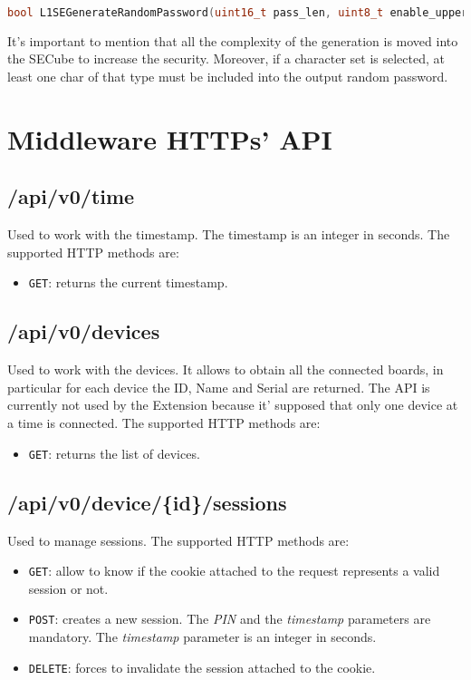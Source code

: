 \begin{lstlisting}[language=C++,breaklines=true]
	bool L1SEGenerateRandomPassword(uint16_t pass_len, uint8_t enable_upper_case, uint8_t enable_special_chars, uint8_t enable_numbers_chars, std::shared_ptr<uint8_t[]> generated_pass);
\end{lstlisting}

It's important to mention that all the complexity of the generation is moved into the SECube to increase the security. Moreover, if a character set is selected, at least one char of that type must be included into the output random password.



\section{Middleware HTTPs' API}

\subsection{/api/v0/time}
Used to work with the timestamp. The timestamp is an integer in seconds. The supported HTTP methods are:

\begin{itemize}
    \item \texttt{GET}: returns the current timestamp.
\end{itemize}

\subsection{/api/v0/devices}
Used to work with the devices. It allows to obtain all the connected boards, in particular for each device the ID, Name and Serial are returned. The API is currently not used by the Extension because it' supposed that only one device at a time is connected. The supported HTTP methods are:

\begin{itemize}
    \item \texttt{GET}: returns the list of devices.
\end{itemize}

\subsection{/api/v0/device/\{id\}/sessions}
Used to manage sessions. The supported HTTP methods are:

\begin{itemize}
    \item \texttt{GET}: allow to know if the cookie attached to the request represents a valid session or not.
    \item \texttt{POST}: creates a new session. The \textit{PIN} and the \textit{timestamp} parameters are mandatory. The \textit{timestamp} parameter is an integer in seconds.
    \item \texttt{DELETE}: forces to invalidate the session attached to the cookie.
\end{itemize}

